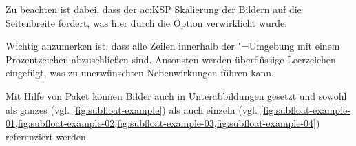 Zu beachten ist dabei, dass der \gls{ac:KSP} Skalierung der Bildern auf die Seitenbreite fordert,
was hier durch die Option  verwirklicht wurde.

Wichtig anzumerken ist, dass alle Zeilen innerhalb der "=Umgebung
mit einem Prozentzeichen abzuschließen sind.
Ansonsten werden überflüssige Leerzeichen eingefügt,
was zu unerwünschten Nebenwirkungen führen kann.

Mit Hilfe von Paket  \cite{Cochran2005} können Bilder auch in
Unterabbildungen gesetzt
und sowohl als ganzes (vgl. \cref{fig:subfloat-example}) als auch einzeln (vgl.
\cref{fig:subfloat-example-01,fig:subfloat-example-02,fig:subfloat-example-03,fig:subfloat-example-04})
referenziert werden.

